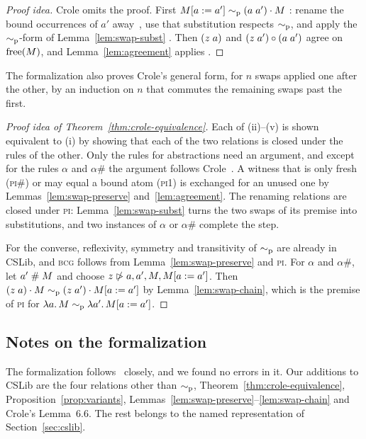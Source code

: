 \begin{proof}[Proof idea]
Crole omits the proof. First
$M[a \mathrel{{:}{=}} a'] \sim_{\mathrm{p}} (a\;a') \cdot M$
:
rename the bound
occurrences of $a'$ away~\cite[Lemma~6.6]{crole2012a}, use that
substitution respects $\sim_{\mathrm{p}}$, and apply the $\sim_{\mathrm{p}}$-form of
Lemma~\ref{lem:swap-subst}
.
Then $(z\;a)$ and
$(z\;a') \circ (a\;a')$ agree on $\mathrm{free}(M)$, and
Lemma~\ref{lem:agreement} applies
.
\end{proof}

The formalization also proves Crole's general form, for $n$ swaps
applied one after the other, by an induction on $n$ that commutes the
remaining swaps past the first.

\begin{proof}[Proof idea of Theorem~\ref{thm:crole-equivalence}]
Each of (ii)--(v) is shown equivalent to (i) by showing that each of
the two relations is closed under the rules of the other. Only the
rules for abstractions need an argument, and except for the rules
$\alpha$ and $\alpha\#$ the argument follows Crole~\cite[pp.~5--8]{crole2012a}.
A witness that is only fresh (\textsc{pi\#}) or may equal a bound atom
(\textsc{pi1}) is exchanged for an unused one by
Lemmas~\ref{lem:swap-preserve} and~\ref{lem:agreement}. The renaming
relations are closed under \textsc{pi}: Lemma~\ref{lem:swap-subst}
turns the two swaps of its premise into substitutions, and two
instances of $\alpha$ or $\alpha\#$ complete the step.

For the converse, reflexivity, symmetry and transitivity of $\sim_{\mathrm{p}}$
are already in CSLib, and \textsc{bcg} follows from
Lemma~\ref{lem:swap-preserve} and \textsc{pi}. For $\alpha$ and
$\alpha\#$, let $a' \mathrel{\#} M$ and choose
$z \mathrel{\ntriangleright} a, a', M, M[a \mathrel{{:}{=}} a']$. Then
$(z\;a) \cdot M \sim_{\mathrm{p}} (z\;a') \cdot M[a \mathrel{{:}{=}} a']$ by
Lemma~\ref{lem:swap-chain}, which is the premise of
\textsc{pi} for $\lambda a.\,M \sim_{\mathrm{p}} \lambda a'.\,M[a \mathrel{{:}{=}} a']$.
\end{proof}

\subsection{Notes on the formalization}
\label{subsec:formalization-notes}

The formalization follows~\cite{crole2012a} closely, and we found no
errors in it.
Our additions to CSLib are the four relations other than $\sim_{\mathrm{p}}$,
Theorem~\ref{thm:crole-equivalence},
Proposition~\ref{prop:variants},
Lemmas~\ref{lem:swap-preserve}--\ref{lem:swap-chain} and Crole's
Lemma~6.6. The rest belongs to
the named representation of Section~\ref{sec:cslib}.

